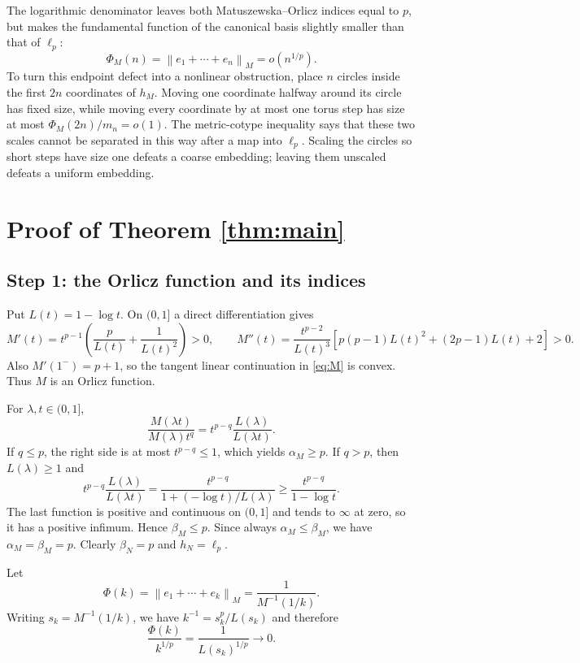\documentclass[11pt]{article}
\newcommand{\norm}[1]{\left\lVert #1\right\rVert}
\begin{document}
The logarithmic denominator leaves both Matuszewska--Orlicz indices equal to
$p$, but makes the fundamental function of the canonical basis slightly
smaller than that of $\ell_p$:
\[
 \Phi_M(n)=\norm{e_1+\cdots+e_n}_M=o(n^{1/p}).
\]
To turn this endpoint defect into a nonlinear obstruction, place $n$ circles
inside the first $2n$ coordinates of $h_M$.  Moving one coordinate halfway
around its circle has fixed size, while moving every coordinate by at most one
torus step has size at most $\Phi_M(2n)/m_n=o(1)$.  The metric-cotype
inequality says that these two scales cannot be separated in this way after a
map into $\ell_p$.  Scaling the circles so short steps have size one defeats a
coarse embedding; leaving them unscaled defeats a uniform embedding.

\section{Proof of Theorem \ref{thm:main}}

\subsection*{Step 1: the Orlicz function and its indices}

Put $L(t)=1-\log t$.  On $(0,1]$ a direct differentiation gives
\[
 M'(t)=t^{p-1}\left(\frac{p}{L(t)}+\frac{1}{L(t)^2}\right)>0,
 \qquad
 M''(t)=\frac{t^{p-2}}{L(t)^3}
 \left[p(p-1)L(t)^2+(2p-1)L(t)+2\right]>0.
\]
Also $M'(1^-)=p+1$, so the tangent linear continuation in
\eqref{eq:M} is convex.  Thus $M$ is an Orlicz function.

For $\lambda,t\in(0,1]$,
\begin{equation}\label{eq:indexratio}
 \frac{M(\lambda t)}{M(\lambda)t^q}
 =t^{p-q}\frac{L(\lambda)}{L(\lambda t)}.
\end{equation}
If $q\le p$, the right side is at most $t^{p-q}\le1$, which yields
$\alpha_M\ge p$.  If $q>p$, then $L(\lambda)\ge1$ and
\[
 t^{p-q}\frac{L(\lambda)}{L(\lambda t)}
 =\frac{t^{p-q}}{1+(-\log t)/L(\lambda)}
 \ge \frac{t^{p-q}}{1-\log t}.
\]
The last function is positive and continuous on $(0,1]$ and tends to
$\infty$ at zero, so it has a positive infimum.  Hence $\beta_M\le p$.
Since always $\alpha_M\le\beta_M$, we have
$\alpha_M=\beta_M=p$.  Clearly $\beta_N=p$ and $h_N=\ell_p$.

Let
\[
 \Phi(k)=\norm{e_1+\cdots+e_k}_M=\frac{1}{M^{-1}(1/k)}.
\]
Writing $s_k=M^{-1}(1/k)$, we have
$k^{-1}=s_k^p/L(s_k)$ and therefore
\begin{equation}\label{eq:fundamental}
 \frac{\Phi(k)}{k^{1/p}}
 =\frac{1}{L(s_k)^{1/p}}\longrightarrow0.
\end{equation}
\end{document}
